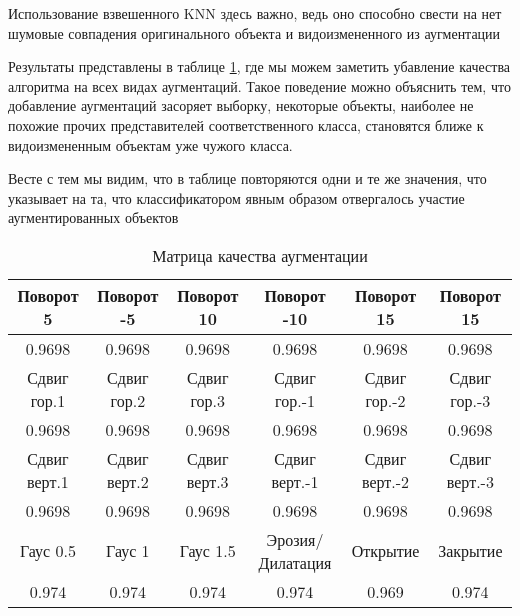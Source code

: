 \documentclass{article}
\begin{document}
            \begin{leftrule}
                Использование взвешенного KNN здесь важно, ведь оно способно свести на нет шумовые совпадения оригинального объекта и видоизмененного из аугментации
            \end{leftrule}

            Результаты представлены в таблице \ref{table:augmentation_scores}, где мы можем заметить убавление качества алгоритма на всех видах аугментаций. Такое поведение можно объяснить тем, что добавление аугментаций засоряет выборку, некоторые объекты, наиболее не похожие прочих представителей соответственного класса, становятся ближе к видоизмененным объектам уже чужого класса.

            Весте с тем мы видим, что в таблице повторяются одни и те же значения, что указывает на та, что классификатором явным образом отвергалось участие аугментированных объектов

\begin{table}[b]
    \centering
    \caption{\label{table:augmentation_scores} Матрица качества аугментации}
    \begin{center}
        \begin{tabular}{|c|c|c|c|c|c|}
            \hline
             Поворот 5 & Поворот -5 & Поворот 10 & Поворот -10 & Поворот 15 & Поворот 15 \\
            \hline
             0.9698 & 0.9698 & 0.9698 & 0.9698 & 0.9698 & 0.9698 \\
            \hline
             Сдвиг гор.1 & Сдвиг гор.2 & Сдвиг гор.3 & Сдвиг гор.-1 & Сдвиг гор.-2 & Сдвиг гор.-3  \\
            \hline
            0.9698 & 0.9698 & 0.9698 & 0.9698 & 0.9698 & 0.9698 \\
            \hline
            Сдвиг верт.1 & Сдвиг верт.2 & Сдвиг верт.3 & Сдвиг верт.-1 & Сдвиг верт.-2 & Сдвиг верт.-3  \\
            \hline
            0.9698 & 0.9698 & 0.9698 & 0.9698 & 0.9698 & 0.9698 \\
            \hline
            Гаус 0.5 & Гаус 1 & Гаус 1.5 & Эрозия/Дилатация & Открытие & Закрытие  \\
            \hline
            0.974 & 0.974 & 0.974 & 0.974 & 0.969 &  0.974 \\
            \hline
        \end{tabular}
    \end{center}
\end{table} 
\end{document}

